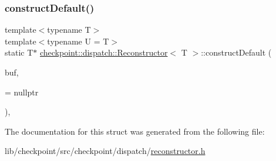 \mbox{\label{structcheckpoint_1_1dispatch_1_1_reconstructor_a74ded346aaee98f25dc498322e6e1411}} 
\subsubsection{\texorpdfstring{construct\+Default()}{constructDefault()}\hspace{0.1cm}{\footnotesize\ttfamily [2/2]}}
{\footnotesize\ttfamily template$<$typename T$>$ \\
template$<$typename U  = T$>$ \\
static T$\ast$ \hyperlink{structcheckpoint_1_1dispatch_1_1_reconstructor}{checkpoint\+::dispatch\+::\+Reconstructor}$<$ T $>$\+::construct\+Default (\begin{DoxyParamCaption}\item[{void $\ast$}]{buf,  }\item[{\hyperlink{structcheckpoint_1_1dispatch_1_1_reconstructor_a0062e5edfdd87b34c3e5464d1f1020ec}{is\+Not\+Default\+Cons\+Type}$<$ U $>$ $\ast$}]{ = {\ttfamily nullptr} }\end{DoxyParamCaption})\hspace{0.3cm}{\ttfamily [inline]}, {\ttfamily [static]}}



The documentation for this struct was generated from the following file\+:\begin{DoxyCompactItemize}
\item 
lib/checkpoint/src/checkpoint/dispatch/\hyperlink{reconstructor_8h}{reconstructor.\+h}\end{DoxyCompactItemize}
